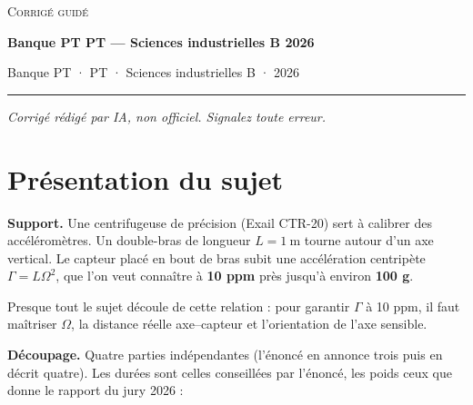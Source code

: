 \documentclass[11pt,a4paper]{article}
\begin{document}
\thispagestyle{plain}
\begin{center}
  {\small\scshape Corrigé guidé}\par\smallskip
  {\LARGE\bfseries Banque PT PT — Sciences industrielles B 2026\par}\medskip
  {\large Banque PT · PT · Sciences industrielles B · 2026\par}
\end{center}
\vspace{2pt}\hrule\vspace{8pt}

\emph{Corrigé rédigé par IA, non officiel. Signalez toute erreur.}

\hypertarget{pruxe9sentation-du-sujet}{%
\section{Présentation du sujet}\label{pruxe9sentation-du-sujet}}

\textbf{Support.} Une centrifugeuse de précision (Exail CTR-20) sert à calibrer des accéléromètres. Un double-bras de longueur \(L = 1\ \text{m}\) tourne autour d'un axe vertical. Le capteur placé en bout de bras subit une accélération centripète \(\Gamma = L\Omega^2\), que l'on veut connaître à \textbf{10 ppm} près jusqu'à environ \textbf{100 g}.

Presque tout le sujet découle de cette relation : pour garantir \(\Gamma\) à 10 ppm, il faut maîtriser \(\Omega\), la distance réelle axe--capteur et l'orientation de l'axe sensible.

\textbf{Découpage.} Quatre parties indépendantes (l'énoncé en annonce trois puis en décrit quatre). Les durées sont celles conseillées par l'énoncé, les poids ceux que donne le rapport du jury 2026 :
\end{document}
